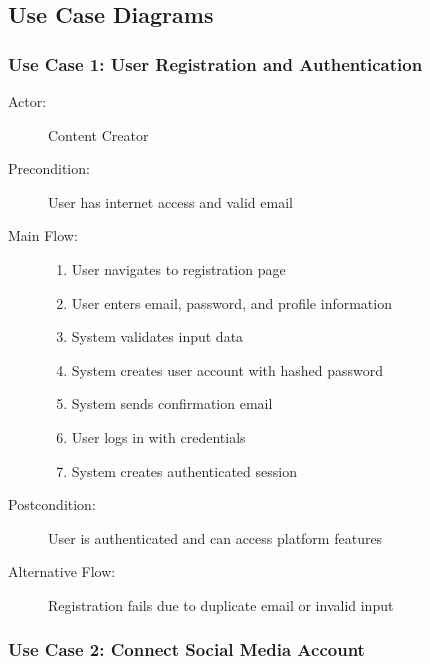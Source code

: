 \subsection{Use Case Diagrams}

\subsubsection{Use Case 1: User Registration and Authentication}

\begin{description}
    \item[Actor:] Content Creator
    \item[Precondition:] User has internet access and valid email
    \item[Main Flow:] 
    \begin{enumerate}
        \item User navigates to registration page
        \item User enters email, password, and profile information
        \item System validates input data
        \item System creates user account with hashed password
        \item System sends confirmation email
        \item User logs in with credentials
        \item System creates authenticated session
    \end{enumerate}
    \item[Postcondition:] User is authenticated and can access platform features
    \item[Alternative Flow:] Registration fails due to duplicate email or invalid input
\end{description}

\subsubsection{Use Case 2: Connect Social Media Account}

